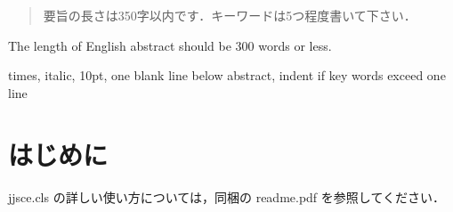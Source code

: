 \documentclass{jjsce}
\begin{document}
\begin{abstract}
要旨の長さは350字以内です．キーワードは5つ程度書いて下さい．
\end{abstract}
\begin{Eabstract}
The length of English abstract should be 300 words or less.
\end{Eabstract}
\begin{keyword}
times, italic, 10pt, one blank line below abstract, indent if key words exceed one line
\end{keyword}
\maketitle

\section{はじめに}

jjsce.cls の詳しい使い方については，同梱の readme.pdf を参照してください．
\end{document}
